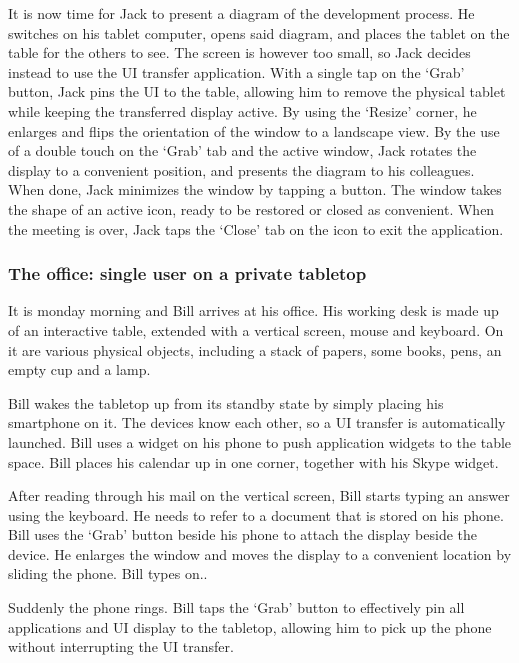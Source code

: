 It is now time for Jack to present a diagram of the development process. 
He switches on his tablet computer, opens said diagram, and places the tablet on the table for the others to see. 
The screen is however too small, so Jack decides instead to use the UI transfer application. 
With a single tap on the `Grab' button, Jack pins the UI to the table, allowing him to remove the physical tablet while keeping the transferred display active. 
By using the `Resize' corner, he enlarges and flips the orientation of the window to a landscape view. 
By the use of a double touch on the `Grab' tab and the active window, Jack rotates the display to a convenient position, and presents the diagram to his colleagues. 
When done, Jack minimizes the window by tapping a button. 
The window takes the shape of an active icon, ready to be restored or closed as convenient. 
When the meeting is over, Jack taps the `Close' tab on the icon to exit the application.

\subsubsection*{The office: single user on a private tabletop}

It is monday morning and Bill arrives at his office. 
His working desk is made up of an interactive table, extended with a vertical screen, mouse and keyboard. 
On it are various physical objects, including a stack of papers, some books, pens, an empty cup and a lamp.

Bill wakes the tabletop up from its standby state by simply placing his smartphone on it. 
The devices know each other, so a UI transfer is automatically launched. 
Bill uses a widget on his phone to push application widgets to the table space. 
Bill places his calendar up in one corner, together with his Skype widget.

After reading through his mail on the vertical screen, Bill starts typing an answer using the keyboard. 
He needs to refer to a document that is stored on his phone. 
Bill uses the `Grab' button beside his phone to attach the display beside the device. 
He enlarges the window and moves the display to a convenient location by sliding the phone. 
Bill types on..

Suddenly the phone rings. 
Bill taps the `Grab' button to effectively pin all applications and UI display to the tabletop, allowing him to pick up the phone without interrupting the UI transfer.
